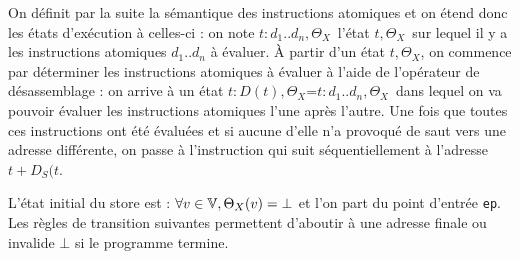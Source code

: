 On définit par la suite la sémantique des instructions atomiques et on étend donc les états d'exécution à celles-ci : on note \textlangle$t:d_1..d_n, \Theta_X$\textrangle\ l'état \textlangle$t, \Theta_X$\textrangle\ sur lequel il y a les instructions atomiques $d_1..d_n$ à évaluer.
À partir d'un état \textlangle$t, \Theta_X$\textrangle, on commence par déterminer les instructions atomiques à évaluer à l'aide de l'opérateur de désassemblage : on arrive à un état \textlangle$t:D(t), \Theta_X$\textrangle=\textlangle$t:d_1..d_n, \Theta_X$\textrangle\ dans lequel on va pouvoir évaluer les instructions atomiques l'une après l'autre. Une fois que toutes ces instructions ont été évaluées et si aucune d'elle n'a provoqué de saut vers une adresse différente, on passe à l'instruction qui suit séquentiellement à l'adresse $t+D_S(t$\textrangle.

L'état initial du store est : $\forall v\in\mathbb V, \Theta_X(v)=\bot$ et l'on part du point d'entrée \texttt{ep}. Les règles de transition suivantes permettent d'aboutir à une adresse finale ou invalide $\bot$ si le programme termine.

% 
% 
% 


